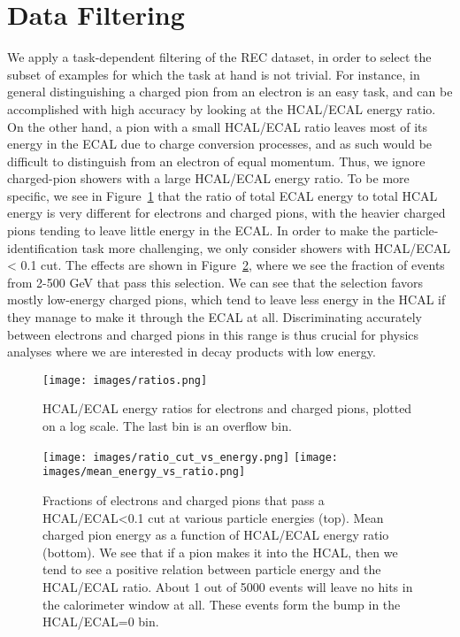 \section{Data Filtering}

We apply a task-dependent filtering of the REC dataset, in order to select the subset of examples for which the task at hand is not trivial. For instance, in general distinguishing a charged pion from an electron is an easy task, and can be accomplished with high accuracy by looking at the HCAL/ECAL energy ratio. On the other hand, a pion with a small HCAL/ECAL ratio leaves most of its energy in the ECAL due to charge conversion processes, and as such would be difficult to distinguish from an electron of equal momentum. Thus, we ignore charged-pion showers with a large HCAL/ECAL energy ratio. To be more specific, we see in Figure~\ref{fig:HE_ratio} that the ratio of total ECAL energy to total HCAL energy is very different for electrons and charged pions, with the heavier charged pions tending to leave little energy in the ECAL. In order to make the particle-identification task more challenging, we only consider showers with HCAL/ECAL < 0.1 cut. The effects are shown in Figure~\ref{fig:HE_ratio_energy}, where we see the fraction of events from 2-500 GeV that pass this selection. We can see that the selection favors mostly low-energy charged pions, which tend to leave less energy in the HCAL if they manage to make it through the ECAL at all. Discriminating accurately between electrons and charged pions in this range is thus crucial for physics analyses where we are interested in decay products with low energy.

\begin{figure}[htbp]
\centering
\texttt{[image: images/ratios.png]}
\caption{HCAL/ECAL energy ratios for electrons and charged pions, plotted on a log scale. The last bin is an overflow bin.} %
\label{fig:HE_ratio}
\end{figure}

\begin{figure}[htbp]
\centering
\texttt{[image: images/ratio\_cut\_vs\_energy.png]}
\texttt{[image: images/mean\_energy\_vs\_ratio.png]}
\caption{Fractions of electrons and charged pions that pass a HCAL/ECAL<0.1 cut at various particle energies (top). Mean charged pion energy as a function of HCAL/ECAL energy ratio (bottom). We see that if a pion makes it into the HCAL, then we tend to see a positive relation between particle energy and the HCAL/ECAL ratio. About 1 out of 5000 events will leave no hits in the calorimeter window at all. These events form the bump in the HCAL/ECAL=0 bin.}
\label{fig:HE_ratio_energy}
\end{figure}

